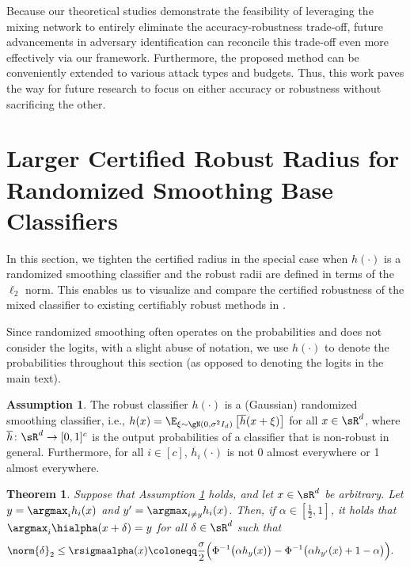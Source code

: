 \documentclass[11pt, letterpaper]{article}
\theoremstyle{plain}
\newtheorem{theorem}{Theorem}
\theoremstyle{definition}
\newtheorem{assumption}{Assumption}
\begin{document}
Because our theoretical studies demonstrate the feasibility of leveraging the mixing network to entirely eliminate the accuracy-robustness trade-off, future advancements in adversary identification can reconcile this trade-off even more effectively via our framework. Furthermore, the proposed method can be conveniently extended to various attack types and budgets. Thus, this work paves the way for future research to focus on either accuracy or robustness without sacrificing the other.








\newpage
\appendix

\section{Larger Certified Robust Radius for Randomized Smoothing Base Classifiers} \label{sec:rs_radius}

In this section, we tighten the certified radius in the special case when $h (\cdot)$ is a randomized smoothing classifier and the robust radii are defined in terms of the $\ell_2$ norm. This enables us to visualize and compare the certified robustness of the mixed classifier to existing certifiably robust methods in .

Since randomized smoothing often operates on the probabilities and does not consider the logits, with a slight abuse of notation, we use $h (\cdot)$ to denote the probabilities throughout this section (as opposed to denoting the logits in the main text).

\begin{assumption}
	\label{as:randomized_smoothing}
	The robust classifier $h (\cdot)$ is a (Gaussian) randomized smoothing classifier, i.e., $h (x) = \E_{\xi \sim \gN (0, \sigma^2 I_d)} \left[ \overline{h} (x+\xi) \right]$ for all $x \in \sR^d$, where $\overline{h} \colon \sR^d \to [0, 1]^c$ is the output probabilities of a classifier that is non-robust in general. Furthermore, for all $i \in [c]$, $\overline{h}_i (\cdot)$ is not 0 almost everywhere or 1 almost everywhere.
\end{assumption}

\begin{theorem}
	\label{thm:randomized_smoothing}
	Suppose that Assumption \ref{as:randomized_smoothing} holds, and let $x \in \sR^d$ be arbitrary. Let $y = \argmax_i h_i(x)$ and $y' = \argmax_{i \ne y} h_i(x)$. Then, if $\alpha \in [\frac{1}{2}, 1]$, it holds that $\argmax_i \hialpha (x+\delta) = y$ for all $\delta \in \sR^d$ such that
	\begin{align*}
		\norm{\delta}_2 & \le \rsigmaalpha (x) \coloneqq \frac{\sigma}{2} \Big( \Phi^{-1} \big( \alpha h_y(x) \big) - \Phi^{-1} \big( \alpha h_{y'} (x) + 1 - \alpha \big) \Big).
	\end{align*}
\end{theorem}
\end{document}
